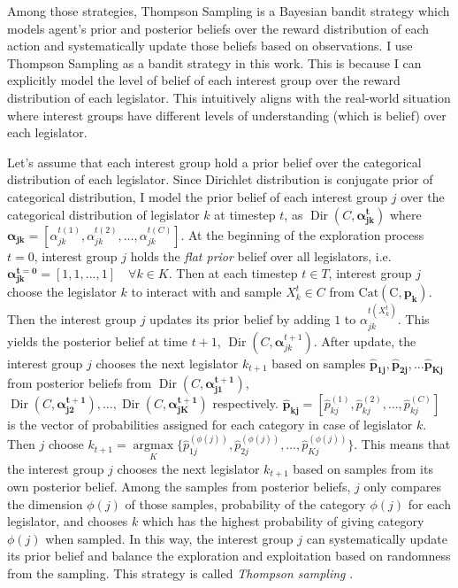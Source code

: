 \documentclass{article}
\begin{document}
Among those strategies,
Thompson Sampling is a Bayesian bandit strategy 
which models agent's prior and posterior beliefs over the reward distribution of each action 
and systematically update those beliefs based on observations.
I use Thompson Sampling as a bandit strategy in this work. 
This is because I can explicitly model the level of belief of each interest group over the reward distribution of each legislator.
This intuitively aligns with the real-world situation where 
interest groups have different levels of understanding (which is belief) over each legislator.



Let's assume that 
each interest group
hold a prior belief over the 
categorical distribution of each legislator.
Since Dirichlet distribution is conjugate prior of categorical distribution,
I model the prior belief of each interest group $j$ over the categorical distribution of legislator $k$ at timestep $t$, as
$\operatorname{Dir}(C, \mathbf{\alpha^t_{jk}})$ where 
$\mathbf{\alpha_{jk}} = [\alpha_{jk}^{t(1)}, \alpha_{jk}^{t(2)}, \hdots, \alpha_{jk}^{t(C)}]$.
At the beginning of the exploration process $t=0$, interest group $j$ 
holds the \textit{flat prior} belief over all legislators, i.e. $\mathbf{\alpha^{t=0}_{jk}} = [1, 1, \hdots, 1]\quad \forall k \in K$.
Then at each timestep $t\in T$, interest group $j$ choose the legislator $k$ to 
interact with and sample $X_k^t \in C$ from $\operatorname{Cat(C, \mathbf{p_k})}$.
Then the interest group $j$ updates its prior belief by adding $1$ to $\alpha_{jk}^{t(X_k^t)}$. 
This yields the posterior belief at time $t+1$, $\operatorname{Dir}(C, \mathbf{\alpha}^{t+1}_{jk})$.
After update, the interest group $j$ chooses the next legislator $k_{t+1}$ 
based on samples $\mathbf{\hat{p}_{1j}}, \mathbf{\hat{p}_{2j}}, \hdots \mathbf{\hat{p}_{Kj}}$ from posterior beliefs 
from $\operatorname{Dir}(C, \mathbf{\alpha^{t+1}_{j1}})$,  $\operatorname{Dir}(C, \mathbf{\alpha^{t+1}_{j2}}), \hdots, \operatorname{Dir}(C, \mathbf{\alpha^{t+1}_{jK}})$ respectively.
$\mathbf{\hat{p}_{kj}}=[\hat{p}^{(1)}_{kj}, \hat{p}^{(2)}_{kj}, \hdots, \hat{p}^{(C)}_{kj}]$ is the vector of probabilities assigned for each category in case of legislator $k$.
Then $j$ choose $k_{t+1} = \underset{K}{\operatorname{argmax}}\{\hat{p}^{(\phi(j))}_{1j}, \hat{p}^{(\phi(j))}_{2j}, \hdots, \hat{p}^{(\phi(j))}_{Kj}\}$.
This means that the interest group $j$ chooses the next legislator $k_{t+1}$ 
based on samples from its own posterior belief.
Among the samples from posterior beliefs, $j$ only compares the 
dimension $\phi(j)$ of those samples,
probability of the category $\phi(j)$ for each legislator,
and chooses $k$ which has the highest probability of giving category $\phi(j)$ when sampled.
In this way, the interest group $j$ can systematically update
its prior belief and
balance the exploration and exploitation based on 
randomness from the sampling. 
This strategy is called \textit{Thompson sampling} \citep{tom}.
\end{document}
